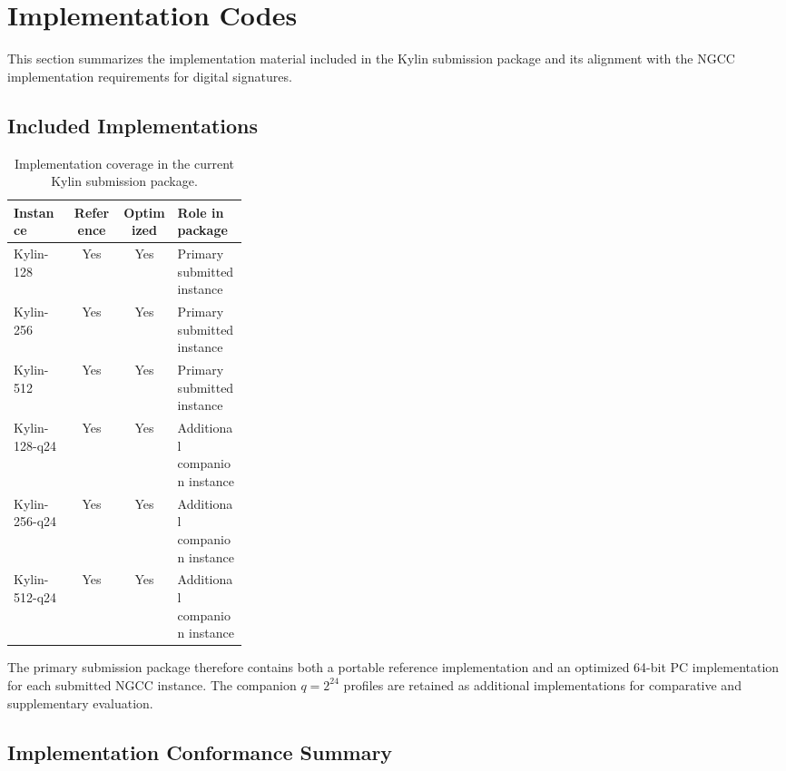 \section{Implementation Codes}
\label{sec:implementation-codes}

This section summarizes the implementation material included in the Kylin submission package and its alignment with the NGCC implementation requirements for digital signatures.

\subsection{Included Implementations}

\begin{table}[htbp]
    \centering
    \caption{Implementation coverage in the current Kylin submission package.}
    \label{tab:implementation-coverage}
    \begin{tabular}{l c c p{0.30\linewidth}}
    \toprule
    Instance & Reference & Optimized & Role in package \\ \midrule
    Kylin-128 & Yes & Yes & Primary submitted instance \\
    Kylin-256 & Yes & Yes & Primary submitted instance \\
    Kylin-512 & Yes & Yes & Primary submitted instance \\
    Kylin-128-q24 & Yes & Yes & Additional companion instance \\
    Kylin-256-q24 & Yes & Yes & Additional companion instance \\
    Kylin-512-q24 & Yes & Yes & Additional companion instance \\
    \bottomrule
    \end{tabular}
\end{table}

The primary submission package therefore contains both a portable reference implementation and an optimized 64-bit PC implementation for each submitted NGCC instance. The companion $q=2^{24}$ profiles are retained as additional implementations for comparative and supplementary evaluation.

\subsection{Implementation Conformance Summary}


